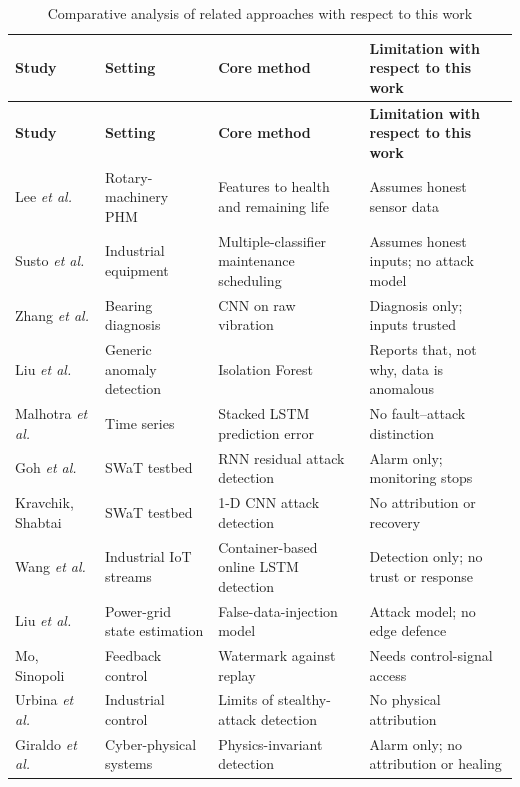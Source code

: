\documentclass[11pt,a4paper]{article}
\begin{document}
\begin{center}
{\small
\setlength{\LTpre}{6pt}
\begin{longtable}{@{}P{2.8cm} P{3.3cm} P{3.5cm} P{4.5cm}@{}}
\caption{Comparative analysis of related approaches with respect to this work}
\label{tab:related}\\
\toprule
\textbf{Study} & \textbf{Setting} & \textbf{Core method} & \textbf{Limitation with respect to this work} \\
\midrule
\endfirsthead
\toprule
\textbf{Study} & \textbf{Setting} & \textbf{Core method} & \textbf{Limitation with respect to this work} \\
\midrule
\endhead
\bottomrule
\endfoot
Lee \emph{et al.} \cite{lee2014phm} & Rotary-machinery PHM & Features to health and remaining life & Assumes honest sensor data \\
Susto \emph{et al.} \cite{susto2015pdm} & Industrial equipment & Multiple-classifier maintenance scheduling & Assumes honest inputs; no attack model \\
Zhang \emph{et al.} \cite{zhang2017wdcnn} & Bearing diagnosis & CNN on raw vibration & Diagnosis only; inputs trusted \\
Liu \emph{et al.} \cite{liu2008iforest} & Generic anomaly detection & Isolation Forest & Reports that, not why, data is anomalous \\
Malhotra \emph{et al.} \cite{malhotra2015lstm} & Time series & Stacked LSTM prediction error & No fault--attack distinction \\
Goh \emph{et al.} \cite{goh2017rnn} & SWaT testbed & RNN residual attack detection & Alarm only; monitoring stops \\
Kravchik, Shabtai \cite{kravchik2018cnn} & SWaT testbed & 1-D CNN attack detection & No attribution or recovery \\
Wang \emph{et al.} \cite{wang2023container} & Industrial IoT streams & Container-based online LSTM detection & Detection only; no trust or response \\
Liu \emph{et al.} \cite{liu2009fdi} & Power-grid state estimation & False-data-injection model & Attack model; no edge defence \\
Mo, Sinopoli \cite{mo2009replay} & Feedback control & Watermark against replay & Needs control-signal access \\
Urbina \emph{et al.} \cite{urbina2016stealthy} & Industrial control & Limits of stealthy-attack detection & No physical attribution \\
Giraldo \emph{et al.} \cite{giraldo2018physics} & Cyber-physical systems & Physics-invariant detection & Alarm only; no attribution or healing \\

\end{longtable}}
\end{center}
\end{document}
